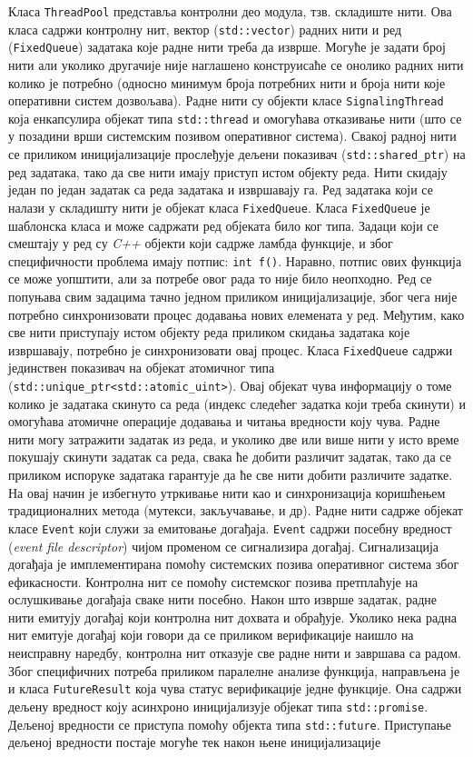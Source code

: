 \documentclass[12pt,oneside]{memoir}
\begin{document}
Класа \texttt{ThreadPool} представља контролни део модула, тзв. складиште нити. Ова класа садржи контролну нит, вектор (\texttt{std::vector}) радних нити и ред (\texttt{FixedQueue}) задатака које радне нити треба да изврше. Могуће је задати број нити али уколико другачије није наглашено конструисаће се онолико радних нити колико је потребно (односно минимум броја потребних нити и броја нити које оперативни систем дозвољава). Радне нити су објекти класе \texttt{SignalingThread} која енкапсулира објекат типа \texttt{std::thread} и омогућава отказивање нити (што се у позадини врши системским позивом оперативног система). Свакој радној нити се приликом иницијализације прослеђује дељени показивач (\texttt{std::shared\_ptr}) на ред задатака, тако да све нити имају приступ истом објекту реда. Нити скидају један по један задатак са реда задатака и извршавају га. Ред задатака који се налази у складишту нити је објекат класа \texttt{FixedQueue}. Класа \texttt{FixedQueue} је шаблонска класа и може садржати ред објеката било ког типа. Задаци који се смештају у ред су \textit{C++} објекти који садрже ламбда функције, и због специфичности проблема имају потпис: \texttt{int f()}. Наравно, потпис ових функција се може уопштити, али за потребе овог рада то није било неопходно. Ред се попуњава свим задацима тачно једном приликом иницијализације, због чега није потребно синхронизовати процес додавања нових елемената у ред. Међутим, како све нити приступају истом објекту реда приликом скидања задатака које извршавају, потребно је синхронизовати овај процес. Класа \texttt{FixedQueue} садржи јединствен показивач на објекат атомичног типа (\texttt{std::unique\_ptr<std::atomic\_uint>}). Овај објекат чува информацију о томе колико је задатака скинуто са реда (индекс следећег задатка који треба скинути) и омогућава атомичне операције додавања и читања вредности коју чува. Радне нити могу затражити задатак из реда, и уколико две или више нити у исто време покушају скинути задатак са реда, свака ће добити различит задатак, тако да се приликом испоруке задатака гарантује да ће све нити добити различите задатке.  На овај начин је избегнуто утркивање нити као и синхронизација коришћењем традиционалних метода (мутекси, закључавање, и др). Радне нити садрже објекат класе \texttt{Event} који служи за емитовање догађаја. \texttt{Event} садржи посебну вредност (\textit{event file descriptor}) чијом променом се сигнализира догађај. Сигнализација догађаја је имплементирана помоћу системских позива оперативног система због ефикасности. Контролна нит се помоћу системског позива претплаћује на ослушкивање догађаја сваке нити посебно. Након што изврше задатак, радне нити емитују догађај који контролна нит дохвата и обрађује. Уколико нека радна нит емитује догађај који говори да се приликом верификације наишло на неисправну наредбу, контролна нит отказује све радне нити и завршава са радом.
Због специфичних потреба приликом паралелне анализе функција, направљена је и класа \texttt{FutureResult} која чува статус верификације једне функције. Она садржи дељену вредност коју асинхроно иницијализује објекат типа \texttt{std::promise}. Дељеној вредности се приступа помоћу објекта типа \texttt{std::future}. Приступање дељеној вредности постаје могуће тек након њене иницијализације
\end{document}
